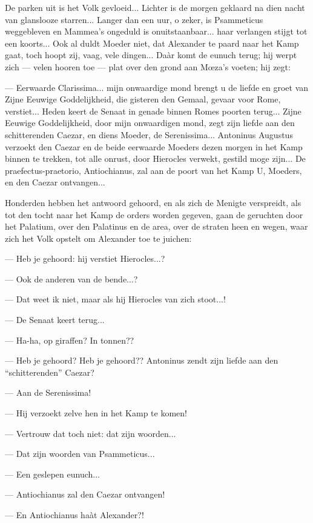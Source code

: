 \documentclass[a4paper, 12pt, oneside, dutch]{article}
\begin{document}
De parken uit is het Volk gevloeid... Lichter is de morgen geklaard na dien nacht van glanslooze starren... Langer dan een uur, o zeker, is Psammeticus weggebleven en Mammea's ongeduld is onuitstaanbaar... haar verlangen stijgt tot een koorts... Ook al duldt Moeder niet, dat Alexander te paard naar het Kamp gaat, toch hoopt zij, vaag, vele dingen... Daàr komt de eunuch terug; hij werpt zich --- velen hooren toe --- plat over den grond aan Mœza's voeten; hij zegt:

--- Eerwaarde Clarissima... mijn onwaardige mond brengt u de liefde en groet van Zijne Eeuwige Goddelijkheid, die gisteren den Gemaal, gevaar voor Rome, verstiet... Heden keert de Senaat in genade binnen Romes poorten terug... Zijne Eeuwige Goddelijkheid, door mijn onwaardigen mond, zegt zijn liefde aan den schitterenden Caezar, en diens Moeder, de Serenissima... Antoninus Augustus verzoekt den Caezar en de beide eerwaarde Moeders dezen morgen in het Kamp binnen te trekken, tot alle onrust, door Hierocles verwekt, gestild moge zijn... De praefectus-praetorio, Antiochianus, zal aan de poort van het Kamp U, Moeders, en den Caezar ontvangen...

Honderden hebben het antwoord gehoord, en als zich de Menigte verspreidt, als tot den tocht naar het Kamp de orders worden gegeven, gaan de geruchten door het Palatium, over den Palatinus en de area, over de straten heen en wegen, waar zich het Volk opstelt om Alexander toe te juichen:

--- Heb je gehoord: hij verstiet Hierocles...?

--- Ook de anderen van de bende...?

--- Dat weet ik niet, maar als hij Hierocles van zich stoot...!

--- De Senaat keert terug...

--- Ha-ha, op giraffen? In tonnen??

--- Heb je gehoord? Heb je gehoord?? Antoninus zendt zijn liefde aan den "`schitterenden"' Caezar?

--- Aan de Serenissima!

--- Hij verzoekt zelve hen in het Kamp te komen!

--- Vertrouw dat toch niet: dat zijn woorden...

--- Dat zijn woorden van Psammeticus...

--- Een geslepen eunuch...

--- Antiochianus zal den Caezar ontvangen!

--- En Antiochianus haàt Alexander?!
\end{document}
